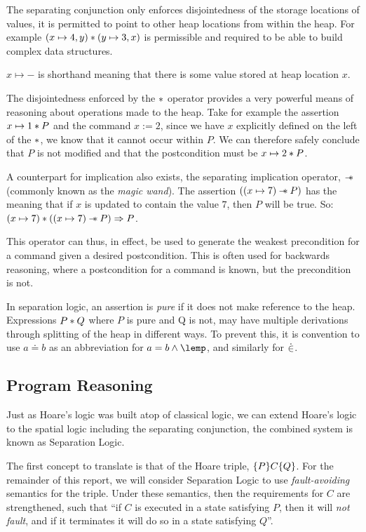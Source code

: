 \documentclass[a4paper,notitlepage]{report}
\begin{document}
  The separating conjunction only enforces disjointedness of the storage
  locations of values, it is permitted to point to other heap locations from
  within the heap. For example $(x \mapsto 4, y) \mathbin{*} (y \mapsto 3, x)$ is
  permissible and required to be able to build complex data structures.
  
  $x \mapsto -$ is shorthand meaning that there is some value stored at heap
  location $x$.

  The disjointedness enforced by the $\mathbin{*}$ operator provides a very powerful
  means of reasoning about operations made to the heap. Take for example the
  assertion $x \mapsto 1 \mathbin{*} P$ and the command $x := 2$, since we have $x$
  explicitly defined on the left of the $\mathbin{*}$, we know that it cannot occur
  within $P$. We can therefore safely conclude that $P$ is not modified and that
  the postcondition must be $x \mapsto 2 \mathbin{*} P$.

  A counterpart for implication also exists,
  the separating implication operator, $\mathbin{-\mkern-6mu *}$ (commonly known as the
  \emph{magic wand}). The assertion $((x
  \mapsto 7) \mathbin{-\mkern-6mu *} P)$ has the meaning that if $x$ is updated to contain the
  value $7$, then $P$ will be true. So: $(x \mapsto 7) \mathbin{*} ((x \mapsto 7) \mathbin{-\mkern-6mu *}
  P) \Rightarrow P$.

  This operator can thus, in effect, be
  used to generate the weakest precondition for a command given a desired
  postcondition. This is often used for backwards reasoning, where a
  postcondition for a command is known, but the precondition is not.

  In separation logic, an assertion is \emph{pure} if it does not make reference
  to the heap. Expressions $P \mathbin{*} Q$ where $P$ is pure and Q is not, may have
  multiple derivations through splitting of the heap in different ways. To
  prevent this, it is convention to use $a \doteq b$ as an abbreviation for
  $a = b \land \lemp$, and similarly for $\mathbin{\dot\in}$.

  \subsection{Program Reasoning}
  \label{subsec:programreasoning}

  Just as Hoare's logic was built atop of classical logic, we can extend
  Hoare's logic to the spatial logic including the separating conjunction,
  the combined system is known as Separation Logic.

  The first concept to translate is that of the Hoare triple, $\{P\}C\{Q\}$.
  For the remainder of this report, we will consider Separation Logic to use
  \emph{fault-avoiding} semantics for the triple. Under these semantics, then the
  requirements for $C$ are strengthened, such that ``if $C$ is executed in a
  state satisfying $P$, then it will \emph{not fault}, and if it terminates it
  will do so in a state satisfying $Q$''.
\end{document}
